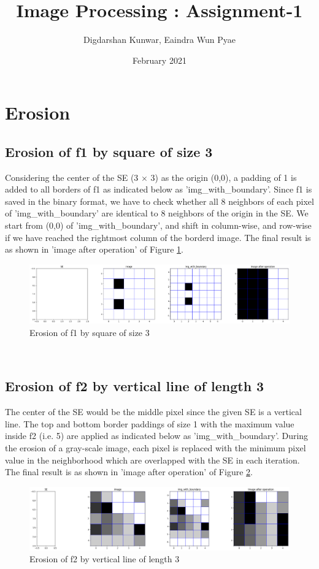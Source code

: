 \documentclass{article}
\title{Image Processing : Assignment-1}
\author{Digdarshan Kunwar, Eaindra Wun Pyae}
\date{February 2021}
\begin{document}
\maketitle

\section{Erosion}
\subsection{Erosion of f1 by square of size 3}

Considering the center of the SE (3 $\times$ 3) as the origin (0,0), a padding of 1 is added to all borders of f1 as indicated below as 'img\_with\_boundary'. Since f1 is saved in the binary format, we have to check whether all 8 neighbors of each pixel of 'img\_with\_boundary' are identical to 8 neighbors of the origin in the SE. We start from (0,0) of 'img\_with\_boundary', and shift in column-wise, and row-wise if we have reached the rightmost column of the borderd image. The final result is as shown in 'image after operation' of Figure \ref{fig:ef1_e1}. \\
\begin{figure}[h!]
\includegraphics[width=\linewidth]{images/ef1_e1.png}
\caption{Erosion of f1 by square of size 3}
\label{fig:ef1_e1}
\end{figure}
\\ 

\subsection{Erosion of f2 by vertical line of length 3 }
 The center of the SE would be the middle pixel since the given SE is a vertical line. The top and bottom border paddings of size 1 with the maximum value inside f2 (i.e. 5) are applied as indicated below as 'img\_with\_boundary'. During the erosion of a gray-scale image, each pixel is replaced with the minimum pixel value in the neighborhood which are overlapped with the SE in each iteration. The final result is as shown in 'image after operation' of Figure \ref{fig:ef2_e2}. \\
\begin{figure}[h!]
\includegraphics[width=\linewidth]{images/ef2_e2.png}
\caption{Erosion of f2 by vertical line of length 3}
\label{fig:ef2_e2}
\end{figure}
\\
\end{document}
